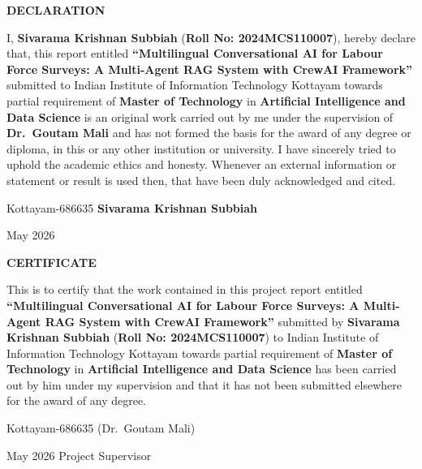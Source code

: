\documentclass[12pt,a4wide]{report}
\theoremstyle{plain}
\theoremstyle{definition}
\theoremstyle{remark}
\begin{document}
\clearpage
 \setcounter{page}{2}
\begin{center}
{\large{\bf{DECLARATION}}}
\end{center}

\noindent I, \textbf{Sivarama Krishnan Subbiah} (\textbf{Roll No: 2024MCS110007}),
hereby declare that, this report entitled
\textbf{``Multilingual Conversational AI for Labour Force Surveys:
A Multi-Agent RAG System with CrewAI Framework''} submitted to Indian
Institute of Information Technology Kottayam towards partial
requirement of {\bf Master of Technology} in \textbf{Artificial Intelligence
and Data Science}
is an original work carried out by me under the supervision of
\textbf{Dr.\ Goutam Mali} and has not formed the basis for the award
of any degree or diploma, in this or any other institution or
university. I have sincerely tried to uphold the academic ethics
and honesty. Whenever an external information or statement or
result is used then, that have been duly acknowledged and cited.

\vspace{4cm}

\noindent Kottayam-686635 \hfill \textbf{Sivarama Krishnan Subbiah}

\noindent May 2026

\clearpage

 \setcounter{page}{3}
\begin{center}
{\large{\bf{CERTIFICATE}}}
\end{center}

\noindent This is to certify that the work contained in this
project report entitled \textbf{``Multilingual Conversational AI for
Labour Force Surveys: A Multi-Agent RAG System with CrewAI Framework''}
submitted by \textbf{Sivarama Krishnan Subbiah}
(\textbf{Roll No: 2024MCS110007}) to Indian Institute of Information
Technology Kottayam towards partial requirement of {\bf Master of Technology}
in \textbf{Artificial Intelligence and Data Science}
has been carried out by him under my supervision and that it has not been
submitted elsewhere for the award of any degree.

\vspace{4cm}

\noindent Kottayam-686635  \hfill (Dr.\ Goutam Mali)

\noindent May 2026 \hfill Project Supervisor
\end{document}
